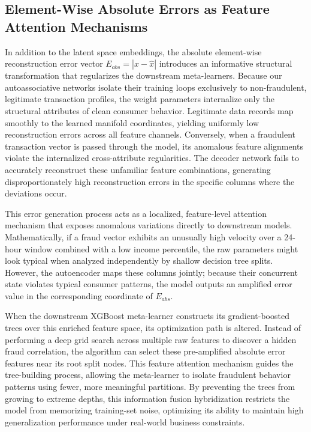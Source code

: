 \documentclass[11pt,a4paper]{report}
\begin{document}
\subsection{Element-Wise Absolute Errors as Feature Attention Mechanisms}
In addition to the latent space embeddings, the absolute element-wise reconstruction error vector $E_{abs}=|x-\hat{x}|$ introduces an informative structural transformation that regularizes the downstream meta-learners. Because our autoassociative networks isolate their training loops exclusively to non-fraudulent, legitimate transaction profiles, the weight parameters internalize only the structural attributes of clean consumer behavior. Legitimate data records map smoothly to the learned manifold coordinates, yielding uniformly low reconstruction errors across all feature channels. Conversely, when a fraudulent transaction vector is passed through the model, its anomalous feature alignments violate the internalized cross-attribute regularities. The decoder network fails to accurately reconstruct these unfamiliar feature combinations, generating disproportionately high reconstruction errors in the specific columns where the deviations occur. 

This error generation process acts as a localized, feature-level attention mechanism that exposes anomalous variations directly to downstream models. Mathematically, if a fraud vector exhibits an unusually high velocity over a 24-hour window combined with a low income percentile, the raw parameters might look typical when analyzed independently by shallow decision tree splits. However, the autoencoder maps these columns jointly; because their concurrent state violates typical consumer patterns, the model outputs an amplified error value in the corresponding coordinate of $E_{abs}$. 

When the downstream XGBoost meta-learner constructs its gradient-boosted trees over this enriched feature space, its optimization path is altered. Instead of performing a deep grid search across multiple raw features to discover a hidden fraud correlation, the algorithm can select these pre-amplified absolute error features near its root split nodes. This feature attention mechanism guides the tree-building process, allowing the meta-learner to isolate fraudulent behavior patterns using fewer, more meaningful partitions. By preventing the trees from growing to extreme depths, this information fusion hybridization restricts the model from memorizing training-set noise, optimizing its ability to maintain high generalization performance under real-world business constraints.
\end{document}
